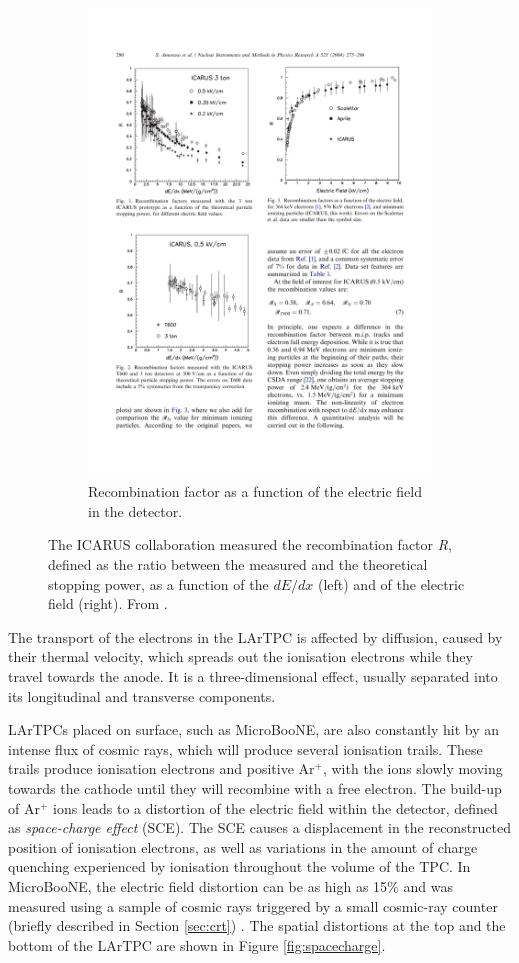 \begin{figure}[htbp]
\begin{subfigure}{0.48\textwidth}
\begin{center}
        \includegraphics[height=0.9\linewidth]{figures/icarus2.pdf}
        \caption{Recombination factor as a function of the electric field in the detector.}
    \end{center}
  \end{subfigure}
    \caption{The ICARUS collaboration measured the recombination factor \emph{R}, defined as the ratio between the measured and the theoretical stopping power, as a function of the $dE/dx$ (left) and of the electric field (right). From \cite{Amoruso:2004dy}.}\label{fig:recombination}
\end{figure}

The transport of the electrons in the LArTPC is affected by diffusion, caused by their thermal velocity, which spreads out the ionisation electrons while they travel towards the anode. It is a three-dimensional effect, usually separated into its longitudinal and transverse components. 

LArTPCs placed on surface, such as MicroBooNE, are also constantly hit by an intense flux of cosmic rays, which will produce several ionisation trails. These trails produce ionisation electrons and positive Ar$^+$, with the ions slowly moving towards the cathode until they will recombine with a free electron. The build-up of Ar$^+$ ions leads to a distortion of the electric
field within the detector, defined as \emph{space-charge effect} (SCE). The SCE causes a displacement in the reconstructed position of ionisation electrons, as well as variations in the amount of charge quenching experienced by ionisation throughout the volume of the TPC. In MicroBooNE, the electric field distortion can be as high as 15\% and was measured using a sample of cosmic rays triggered by a small cosmic-ray counter (briefly described in Section \ref{sec:crt}) \cite{sce}. The spatial distortions at the top and the bottom of the LArTPC are shown in Figure \ref{fig:spacecharge}.


